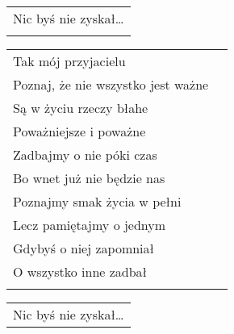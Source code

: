 \documentclass[a5paper]{article}
\begin{document}
\noindent
\begin{tabular}{@{}p{7.00cm}@{}}
Nic byś nie zyskał… \\ \\
\end{tabular}

\noindent
\begin{tabular}{@{}p{8.00cm}p{3cm}@{}}
Tak mój przyjacielu \\
Poznaj, że nie wszystko jest ważne \\
Są w życiu rzeczy błahe \\
Poważniejsze i poważne \\
Zadbajmy o nie póki czas \\
Bo wnet już nie będzie nas \\
Poznajmy smak życia w pełni \\
Lecz pamiętajmy o jednym \\
Gdybyś o niej zapomniał \\
O wszystko inne zadbał \\ \\
\end{tabular}

\noindent
\begin{tabular}{@{}p{7.00cm}@{}}
Nic byś nie zyskał…
\end{tabular}
\end{document}
